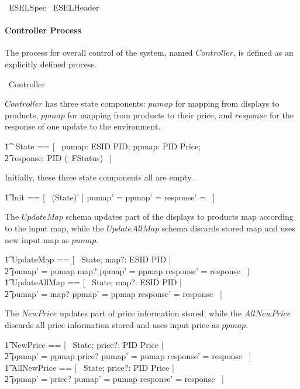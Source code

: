 \begin{zsection}
	\SECTION\ ESELSpec \parents\ ESELHeader 
\end{zsection}

\paragraph{Controller Process}
The process for overall control of the system, named $Controller$, is defined as an explicitly defined process.

\begin{circus}
	\circprocess\ Controller \circdef \circbegin \\
\end{circus}

$Controller$ has three state components: $pumap$ for mapping from displays to products, $ppmap$ for mapping from products to their price, and $response$ for the response of one update to the environment.
\begin{circusaction}
    	\t1 \circstate\ State == [~ pumap: ESID \pfun PID; ppmap: PID \pfun Price; \\
            \t2 response: PID \pfun (\power~FStatus) ~]
\end{circusaction}
Initially, these three state components all are empty.
\begin{zed}
    	\t1	Init == [~ (State)' | pumap' = \emptyset \land ppmap' = \emptyset \land response' = \emptyset ~]
\end{zed}
The $UpdateMap$ schema updates part of the displays to products map according to the input map, while the $UpdateAllMap$ schema discards stored map and uses new input map as $pumap$. 
\begin{zed}
        \t1 UpdateMap == [~ \Delta State; map?: ESID \pfun PID | \\
            \t2 pumap' = pumap \oplus map? \land ppmap' = ppmap \land response' = response ~] \\
        \t1 UpdateAllMap == [~ \Delta State; map?: ESID \pfun PID | \\
            \t2 pumap' = map? \land ppmap' = ppmap \land response' = response ~] 
\end{zed}
The $NewPrice$ updates part of price information stored, while the $AllNewPrice$ discards all price information stored and uses input price as $ppmap$. 
\begin{zed}
        \t1 NewPrice == [~ \Delta State; price?: PID \pfun Price | \\
            \t2 ppmap' = ppmap \oplus price? \land pumap' = pumap \land response' = response ~] \\
        \t1 AllNewPrice == [~ \Delta State; price?: PID \pfun Price | \\
            \t2 ppmap' = price? \land pumap' = pumap \land response' = response ~]
\end{zed}
